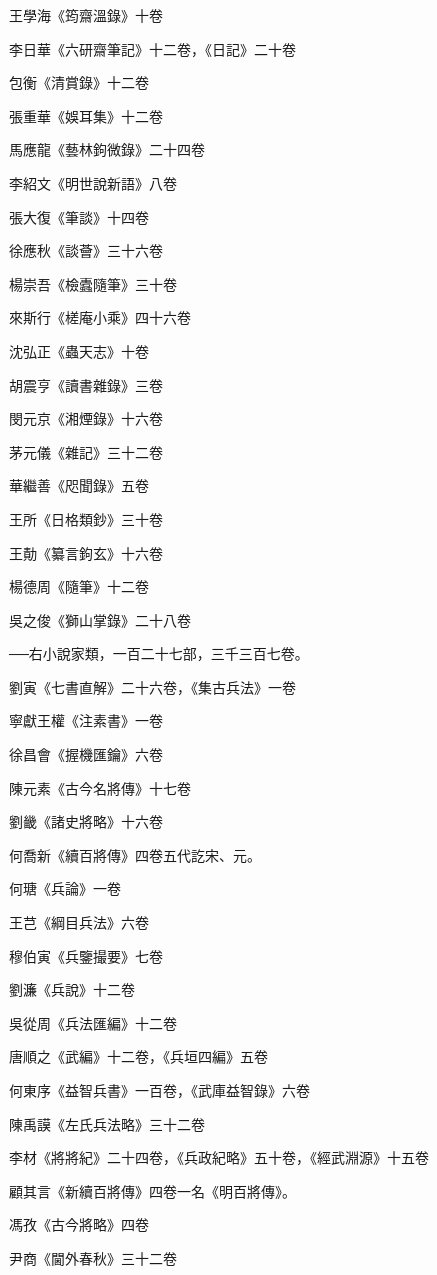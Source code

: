 王學海《筠齋溫錄》十卷

李日華《六研齋筆記》十二卷，《日記》二十卷

包衡《清賞錄》十二卷

張重華《娛耳集》十二卷

馬應龍《藝林鉤微錄》二十四卷

李紹文《明世說新語》八卷

張大復《筆談》十四卷

徐應秋《談薈》三十六卷

楊崇吾《檢蠹隨筆》三十卷

來斯行《槎庵小乘》四十六卷

沈弘正《蟲天志》十卷

胡震亨《讀書雜錄》三卷

閔元京《湘煙錄》十六卷

茅元儀《雜記》三十二卷

華繼善《咫聞錄》五卷

王所《日格類鈔》三十卷

王勣《纂言鉤玄》十六卷

楊德周《隨筆》十二卷

吳之俊《獅山掌錄》二十八卷

──右小說家類，一百二十七部，三千三百七卷。

劉寅《七書直解》二十六卷，《集古兵法》一卷

寧獻王權《注素書》一卷

徐昌會《握機匯鑰》六卷

陳元素《古今名將傳》十七卷

劉畿《諸史將略》十六卷

何喬新《續百將傳》四卷五代訖宋、元。

何瑭《兵論》一卷

王芑《綱目兵法》六卷

穆伯寅《兵鑒撮要》七卷

劉濂《兵說》十二卷

吳從周《兵法匯編》十二卷

唐順之《武編》十二卷，《兵垣四編》五卷

何東序《益智兵書》一百卷，《武庫益智錄》六卷

陳禹謨《左氏兵法略》三十二卷

李材《將將紀》二十四卷，《兵政紀略》五十卷，《經武淵源》十五卷

顧其言《新續百將傳》四卷一名《明百將傳》。

馮孜《古今將略》四卷

尹商《閫外春秋》三十二卷

